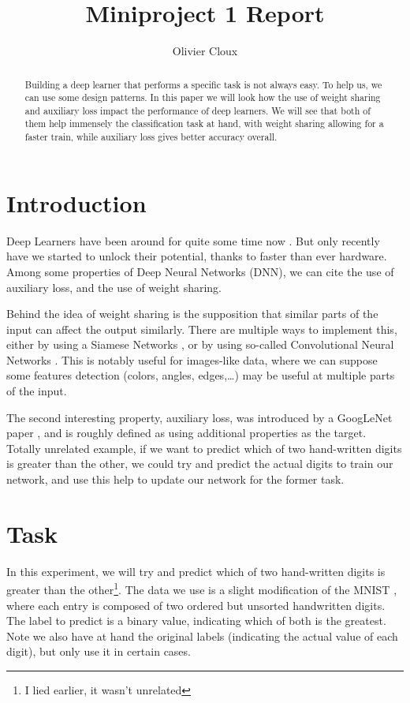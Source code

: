 \documentclass[10pt,conference]{IEEEtran}
\begin{document}
\title{Miniproject 1 Report}
\author[1]{Olivier Cloux}

\maketitle

\begin{abstract}
Building a deep learner that performs a specific task is not always easy. To help us, we can use some design patterns. In this paper we will look how the use of weight sharing and auxiliary loss impact the performance of deep learners. We will see that both of them help immensely the classification task at hand, with weight sharing allowing for a faster train, while auxiliary loss gives better accuracy overall.
\end{abstract}

\section{Introduction}
Deep Learners have been around for quite some time now \cite{noauthor_deep_2020}. But only recently have we started to unlock their potential, thanks to faster than ever hardware. Among some properties of Deep Neural Networks (DNN), we can cite the use of auxiliary loss, and the use of weight sharing.

Behind the idea of weight sharing is the supposition that similar parts of the input can affect the output similarly. There are multiple ways to implement this, either by using a Siamese Networks \cite{noauthor_siamese_2020}, or by using so-called Convolutional Neural Networks \cite{noauthor_convolutional_2020}. This is notably useful for images-like data, where we can suppose some features detection (colors, angles, edges,\ldots) may be useful at multiple parts of the input.

The second interesting property, auxiliary loss, was introduced by a GoogLeNet paper \cite{szegedy_going_2014}, and is roughly defined as using additional properties as the target. Totally unrelated example, if we want to predict which of two hand-written digits is greater than the other, we could try and predict the actual digits to train our network, and use this help to update our network for the former task.

\section{Task}
In this experiment, we will try and predict which of two hand-written digits is greater than the other\footnote{I lied earlier, it wasn't unrelated}. The data we use is a slight modification of the MNIST \cite{lecun_mnist_1998}, where each entry is composed of two ordered but unsorted handwritten digits. The label to predict is a binary value, indicating which of both is the greatest. Note we also have at hand the original labels (indicating the actual value of each digit), but only use it in certain cases.
\end{document}
